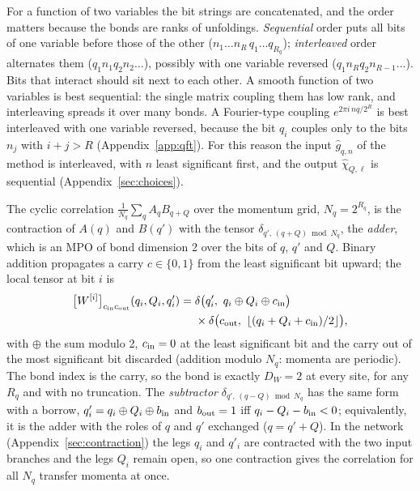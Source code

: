 \documentclass[aps,prb,reprint,a4paper]{revtex4-2}
\begin{document}
For a function of two variables the bit strings are concatenated, and the order matters because the bonds are ranks of unfoldings. \emph{Sequential} order puts all bits of one variable before those of the other ($n_1\ldots n_R\,q_1\ldots q_{R_q}$); \emph{interleaved} order alternates them ($q_1n_1q_2n_2\ldots$), possibly with one variable reversed ($q_1n_Rq_2n_{R-1}\ldots$). Bits that interact should sit next to each other. A smooth function of two variables is best sequential: the single matrix coupling them has low rank, and interleaving spreads it over many bonds. A Fourier-type coupling $e^{2\pi i\,nq/2^R}$ is best interleaved with one variable reversed, because the bit $q_i$ couples only to the bits $n_j$ with $i+j>R$ (Appendix~\ref{app:qft}). For this reason the input $\hat g_{q,n}$ of the method is interleaved, with $n$ least significant first, and the output $\hat\chi_{Q,\ell}$ is sequential (Appendix~\ref{sec:choices}).

The cyclic correlation $\frac1{N_q}\sum_qA_qB_{q+Q}$ over the momentum grid, $N_q=2^{R_q}$, is the contraction of $A(q)$ and $B(q')$ with the tensor $\delta_{q',\,(q+Q)\bmod N_q}$, the \emph{adder}, which is an MPO of bond dimension 2 over the bits of $q$, $q'$ and $Q$. Binary addition propagates a carry $c\in\{0,1\}$ from the least significant bit upward; the local tensor at bit $i$ is
\begin{equation}
  \begin{aligned}
  \big[W^{[i]}\big]_{c_{\rm in}c_{\rm out}}(q_i,Q_i,q'_i)={}&\delta\big(q'_i,\ q_i\oplus Q_i\oplus c_{\rm in}\big)\\
  &\times\delta\big(c_{\rm out},\ \lfloor(q_i+Q_i+c_{\rm in})/2\rfloor\big),
  \end{aligned}
  \label{eq:adder}
\end{equation}
with $\oplus$ the sum modulo 2, $c_{\rm in}=0$ at the least significant bit and the carry out of the most significant bit discarded (addition modulo $N_q$: momenta are periodic). The bond index is the carry, so the bond is exactly $D_W=2$ at every site, for any $R_q$ and with no truncation. The \emph{subtractor} $\delta_{q',\,(q-Q)\bmod N_q}$ has the same form with a borrow, $q'_i=q_i\oplus Q_i\oplus b_{\rm in}$ and $b_{\rm out}=1$ iff $q_i-Q_i-b_{\rm in}<0$; equivalently, it is the adder with the roles of $q$ and $q'$ exchanged ($q=q'+Q$). In the network (Appendix~\ref{sec:contraction}) the legs $q_i$ and $q'_i$ are contracted with the two input branches and the legs $Q_i$ remain open, so one contraction gives the correlation for all $N_q$ transfer momenta at once.
\end{document}
